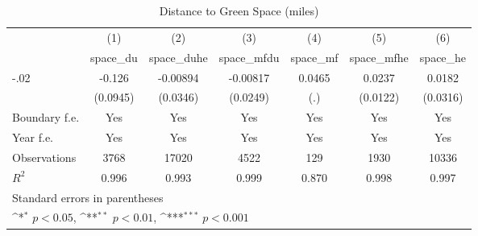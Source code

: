 \begin{table}[htbp]\centering
\def\sym#1{\ifmmode^{#1}\else\(^{#1}\)\fi}
\caption{Distance to Green Space (miles)}
\begin{tabular}{l*{6}{c}}
\hline\hline
                    &\multicolumn{1}{c}{(1)}&\multicolumn{1}{c}{(2)}&\multicolumn{1}{c}{(3)}&\multicolumn{1}{c}{(4)}&\multicolumn{1}{c}{(5)}&\multicolumn{1}{c}{(6)}\\
                    &\multicolumn{1}{c}{space\_du}&\multicolumn{1}{c}{space\_duhe}&\multicolumn{1}{c}{space\_mfdu}&\multicolumn{1}{c}{space\_mf}&\multicolumn{1}{c}{space\_mfhe}&\multicolumn{1}{c}{space\_he}\\
\hline
-.02                &      -0.126         &    -0.00894         &    -0.00817         &      0.0465         &      0.0237         &      0.0182         \\
                    &    (0.0945)         &    (0.0346)         &    (0.0249)         &         (.)         &    (0.0122)         &    (0.0316)         \\
[1em]
Boundary f.e.       &         Yes         &         Yes         &         Yes         &         Yes         &         Yes         &         Yes         \\
[1em]
Year f.e.           &         Yes         &         Yes         &         Yes         &         Yes         &         Yes         &         Yes         \\
\hline
Observations        &        3768         &       17020         &        4522         &         129         &        1930         &       10336         \\
\(R^{2}\)           &       0.996         &       0.993         &       0.999         &       0.870         &       0.998         &       0.997         \\
\hline\hline
\multicolumn{7}{l}{\footnotesize Standard errors in parentheses}\\
\multicolumn{7}{l}{\footnotesize \sym{*} \(p<0.05\), \sym{**} \(p<0.01\), \sym{***} \(p<0.001\)}\\
\end{tabular}
\end{table}
